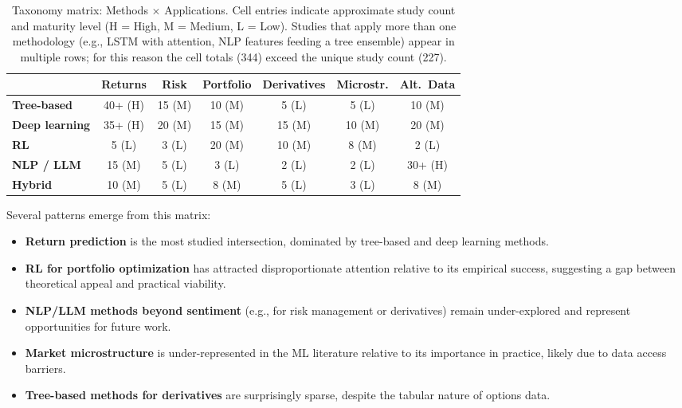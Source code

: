 \begin{table}[H]
\centering
\caption{Taxonomy matrix: Methods $\times$ Applications. Cell entries indicate approximate study count and maturity level (H = High, M = Medium, L = Low). Studies that apply more than one methodology (e.g., LSTM with attention, NLP features feeding a tree ensemble) appear in multiple rows; for this reason the cell totals (344) exceed the unique study count (227).}
\label{tab:taxonomy_matrix}
\small
\begin{tabular}{l c c c c c c}
\toprule
& \textbf{Returns} & \textbf{Risk} & \textbf{Portfolio} & \textbf{Derivatives} & \textbf{Microstr.} & \textbf{Alt.\ Data} \\
\midrule
\textbf{Tree-based}  & 40+ (H) & 15 (M) & 10 (M) & 5 (L)  & 5 (L)  & 10 (M) \\
\textbf{Deep learning} & 35+ (H) & 20 (M) & 15 (M) & 15 (M) & 10 (M) & 20 (M) \\
\textbf{RL}           & 5 (L)   & 3 (L)  & 20 (M) & 10 (M) & 8 (M)  & 2 (L) \\
\textbf{NLP / LLM}   & 15 (M)  & 5 (L)  & 3 (L)  & 2 (L)  & 2 (L)  & 30+ (H) \\
\textbf{Hybrid}       & 10 (M)  & 5 (L)  & 8 (M)  & 5 (L)  & 3 (L)  & 8 (M) \\
\bottomrule
\end{tabular}
\end{table}

Several patterns emerge from this matrix:

\begin{itemize}[leftmargin=*]
    \item \textbf{Return prediction} is the most studied intersection, dominated by tree-based and deep learning methods.
    \item \textbf{RL for portfolio optimization} has attracted disproportionate attention relative to its empirical success, suggesting a gap between theoretical appeal and practical viability.
    \item \textbf{NLP/LLM methods beyond sentiment} (e.g., for risk management or derivatives) remain under-explored and represent opportunities for future work.
    \item \textbf{Market microstructure} is under-represented in the ML literature relative to its importance in practice, likely due to data access barriers.
    \item \textbf{Tree-based methods for derivatives} are surprisingly sparse, despite the tabular nature of options data.
\end{itemize}
